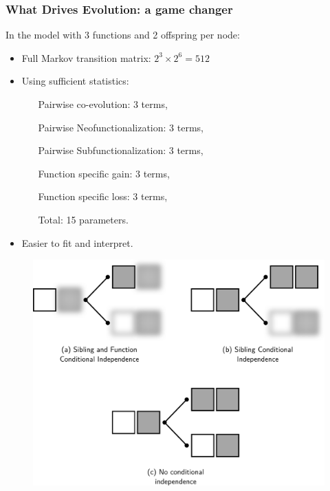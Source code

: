 \documentclass[aspectratio=169, 9pt]{beamer}
\begin{document}
\begin{frame}[c]
	\frametitle{What Drives Evolution: a game changer}
	
	\begin{minipage}[m]{.59\linewidth}
		In the model with 3 functions and 2 offspring per node:\pause
		\begin{itemize}
			\item Full Markov transition matrix: $2^3 \times 2^6 = 512$\pause
			\item Using sufficient statistics:\pause
			\begin{itemize}
				\item[] Pairwise co-evolution: 3 terms,\pause
				\item[]	Pairwise Neofunctionalization: 3 terms,\pause
				\item[] Pairwise Subfunctionalization: 3 terms,\pause
				\item[] Function specific gain: 3 terms,\pause
				\item[] Function specific loss: 3 terms,\pause
				\item[Total:] 15 parameters. \pause
			\end{itemize}
			\item Easier to fit and interpret.
		\end{itemize}
	\end{minipage}\hfill
	\begin{minipage}[m]{.39\linewidth}
		\begin{figure}
			\centering
			\includegraphics[width=.99\linewidth]{phylo-model-overview.pdf}
		\end{figure}
	\end{minipage}
	\vfill\hfill\hyperlink{aphylo-ergm-example}{}
\end{frame}
\end{document}
